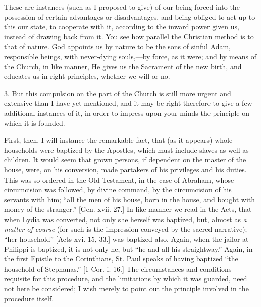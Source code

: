 These are instances (such as I proposed to give) of our being
forced into the possession of certain advantages or disadvantages, and
being obliged to act up to this our state, to cooperate with it,
according to the inward power given us, instead of drawing back from
it. You see how parallel the Christian method is to that of nature.
God appoints us by nature to be the sons of sinful Adam, responsible
beings, with never-dying souls,—by force, as it were; and by means
of the Church, in like manner, He gives us the Sacrament of the new
birth, and educates us in right principles, whether we will or no.

3. But this compulsion on the part of the Church is still more
urgent and extensive than I have yet mentioned, and it may be right
therefore to give a few additional instances of it, in order to
impress upon your minds the principle on which it is founded.

First, then, I will instance the remarkable fact, that (as it
appears) whole households were baptized by the Apostles, which must
include slaves as well as children. It would seem that grown persons,
if dependent on the master of the house, were, on his conversion, made
partakers of his privileges and his duties. This was so ordered in the
Old Testament, in the case of Abraham, whose circumcision was
followed, by divine command, by the circumcision of his servants with
him; ``all the men of his house, born in the house, and bought
with money of the stranger.'' [Gen. xvii. 27.] In like manner we
read in the Acts, that when Lydia was converted, not only she herself
was baptized, but, almost as \emph{a matter of course} (for such is
the impression conveyed by the sacred narrative); ``her
household'' [Acts xvi. 15, 33.] was baptized also. Again, when the
jailor at Philippi is baptized, it is not only he, but ``he and
all his straightway.'' Again, in the first Epistle to the
Corinthians, St. Paul speaks of having baptized ``the household of
Stephanas.'' [1 Cor. i. 16.] The circumstances and conditions
requisite for this procedure, and the limitations by which it was
guarded, need not here be considered; I wish merely to point out the
principle involved in the procedure itself.

